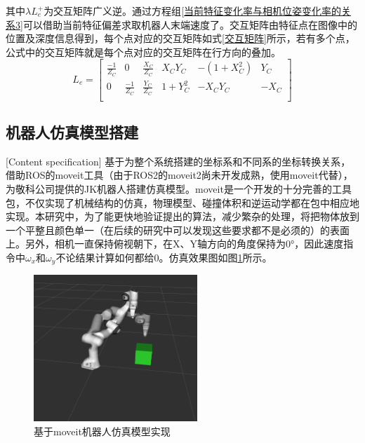 \documentclass[fontset=fandol,type=bachelor,campus=harbin]{hithesisbook}
\begin{document}
其中$\lambda L_{e}^{+}$为交互矩阵广义逆。通过方程组\ref{当前特征变化率与相机位姿变化率的关系3}可以借助当前特征偏差求取机器人末端速度了。交互矩阵由特征点在图像中的位置及深度信息得到，每个点对应的交互矩阵如式\ref{交互矩阵}所示，若有多个点，公式中的交互矩阵就是每个点对应的交互矩阵在行方向的叠加。
 \begin{equation}
L_e=\left[ \begin{matrix}
	\frac{-1}{Z_C}&		0&		\frac{X_C}{Z_C}&		X_CY_C&		-\left( 1+X_{C}^{2} \right)&		Y_C\\
	0&		\frac{-1}{Z_C}&		\frac{Y_C}{Z_C}&		1+Y_{C}^{2}&		-X_CY_C&		-X_C\\
\end{matrix} \right] 
\label{交互矩阵} 
\end{equation} 

\subsection{机器人仿真模型搭建}[Content specification]
基于为整个系统搭建的坐标系和不同系的坐标转换关系，借助ROS的moveit工具（由于ROS2的moveit2尚未开发成熟，使用moveit代替），为敬科公司提供的JK机器人搭建仿真模型。moveit是一个开发的十分完善的工具包，不仅实现了机械结构的仿真，物理模型、碰撞体积和逆运动学都在包中相应地实现。本研究中，为了能更快地验证提出的算法，减少繁杂的处理，将把物体放到一个平整且颜色单一（在后续的研究中可以发现这些要求都不是必须的）的表面上。另外，相机一直保持俯视朝下，在X、Y轴方向的角度保持为0°，因此速度指令中$\omega _x$和$\omega _y$不论结果计算如何都给0。仿真效果图如图\ref{基于moveit机器人仿真模型实现}所示。
\begin{figure}[h]
\centering
\includegraphics[width = 0.55\textwidth]{chapter2/基于moveit机器人仿真模型实现}
\caption{基于moveit机器人仿真模型实现}
\label{基于moveit机器人仿真模型实现}
\end{figure}
\end{document}
